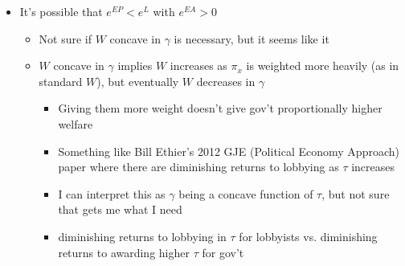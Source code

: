 \documentclass[12pt]{article}
\newcommand{\ga}{\gamma}
\begin{document}
\begin{itemize}
\begin{itemize}
		\end{itemize}
	 \item It's possible that $e^{EP} < e^{L}$ with $e^{EA} > 0$
		\begin{itemize}
			\item Not sure if $W$ concave in $\ga$ is necessary, but it seems like it
			\item $W$ concave in $\ga$ implies $W$ increases as $\pi_x$ is weighted more heavily (as in standard $W$), but eventually $W$ decreases in $\ga$
				\begin{itemize}
					\item Giving them more weight doesn't give gov't proportionally higher welfare
					\item Something like Bill Ethier's 2012 GJE (Political Economy Approach) paper where there are diminishing returns to lobbying as $\tau$ increases
					\item I can interpret this as $\ga$ being a concave function of $\tau$, but not sure that gets me what I need
					\item diminishing returns to lobbying in $\tau$ for lobbyists vs. diminishing returns to awarding higher $\tau$ for gov't
				\end{itemize}
		\end{itemize}
\end{itemize}
\end{document}
